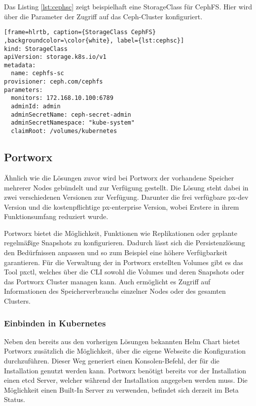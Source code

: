 Das Listing \ref{lst:cephsc} zeigt beispielhaft eine StorageClass für CephFS. Hier wird über die Parameter der Zugriff auf das Ceph-Cluster konfiguriert.

\lstset{language=yaml}
\begin{lstlisting}[frame=hlrtb, caption={StorageClass CephFS} ,backgroundcolor=\color{white}, label={lst:cephsc}]
kind: StorageClass
apiVersion: storage.k8s.io/v1
metadata:
  name: cephfs-sc
provisioner: ceph.com/cephfs
parameters:
  monitors: 172.168.10.100:6789
  adminId: admin
  adminSecretName: ceph-secret-admin
  adminSecretNamespace: "kube-system"
  claimRoot: /volumes/kubernetes
\end{lstlisting}

\subsection{Portworx}
Ähnlich wie die Lösungen zuvor wird bei Portworx der vorhandene Speicher mehrerer Nodes gebündelt und zur Verfügung gestellt. Die Lösung steht dabei in zwei verschiedenen Versionen zur Verfügung. Darunter die frei verfügbare px-dev Version und die kostenpflichtige px-enterprise Version, wobei Erstere in ihrem Funktionsumfang reduziert wurde. \medskip

Portworx bietet die Möglichkeit, Funktionen wie Replikationen oder geplante regelmäßige Snapshots zu konfigurieren. Dadurch lässt sich die Persistenzlösung den Bedürfnissen anpassen und so zum Beispiel eine höhere Verfügbarkeit garantieren.
Für die Verwaltung der in Portworx erstellten Volumes gibt es das Tool pxctl, welches über die \ac{CLI} sowohl die Volumes und deren Snapshots oder das Portworx Cluster managen kann. Auch ermöglicht es Zugriff auf Informationen des Speicherverbrauchs einzelner Nodes oder des gesamten Clusters.

\subsubsection{Einbinden in Kubernetes}
Neben den bereits aus den vorherigen Lösungen bekannten Helm Chart bietet Portworx zusätzlich die Möglichkeit, über die eigene Webseite die Konfiguration durchzuführen. Dieser Weg generiert einen Konsolen-Befehl, der für die Installation genutzt werden kann. Portworx benötigt bereits vor der Installation einen etcd Server, welcher während der Installation angegeben werden muss. Die Möglichkeit einen Built-In Server zu verwenden, befindet sich derzeit im Beta Status. \medskip

